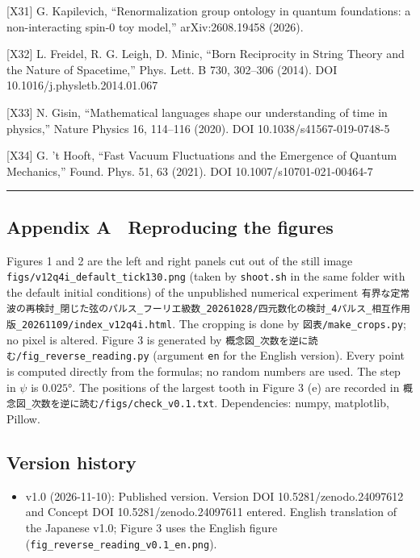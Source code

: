 \documentclass[
  a4paper,
]{article}
\providecommand{\tightlist}{%
  \setlength{\itemsep}{0pt}\setlength{\parskip}{0pt}}
\begin{document}
{[}X31{]} G. Kapilevich, ``Renormalization group ontology in quantum
foundations: a non-interacting spin-0 toy model,'' arXiv:2608.19458
(2026).

{[}X32{]} L. Freidel, R. G. Leigh, D. Minic, ``Born Reciprocity in
String Theory and the Nature of Spacetime,'' Phys. Lett. B 730, 302--306
(2014). DOI 10.1016/j.physletb.2014.01.067

{[}X33{]} N. Gisin, ``Mathematical languages shape our understanding of
time in physics,'' Nature Physics 16, 114--116 (2020). DOI
10.1038/s41567-019-0748-5

{[}X34{]} G. 't Hooft, ``Fast Vacuum Fluctuations and the Emergence of
Quantum Mechanics,'' Found. Phys. 51, 63 (2021). DOI
10.1007/s10701-021-00464-7

\begin{center}\rule{0.5\linewidth}{0.5pt}\end{center}

\subsection{Appendix A　Reproducing the
figures}\label{appendix-a-reproducing-the-figures}

Figures 1 and 2 are the left and right panels cut out of the still image
\texttt{figs/\allowbreak{}v12q4i\_\allowbreak{}default\_\allowbreak{}tick130.png} (taken by \texttt{shoot.sh}
in the same folder with the default initial conditions) of the
unpublished numerical experiment
\texttt{有界な定常波の再検討\_\allowbreak{}閉じた弦のパルス\_\allowbreak{}フーリエ級数\_\allowbreak{}20261028/\allowbreak{}四元数化の検討\_\allowbreak{}4パルス\_\allowbreak{}相互作用版\_\allowbreak{}20261109/\allowbreak{}index\_\allowbreak{}v12q4i.html}.
The cropping is done by \texttt{図表/\allowbreak{}make\_\allowbreak{}crops.py}; no pixel is
altered. Figure 3 is generated by
\texttt{概念図\_\allowbreak{}次数を逆に読む/\allowbreak{}fig\_\allowbreak{}reverse\_\allowbreak{}reading.py} (argument
\texttt{en} for the English version). Every point is computed directly
from the formulas; no random numbers are used. The step in \(\psi\) is
\(0.025°\). The positions of the largest tooth in Figure 3 (e) are
recorded in \texttt{概念図\_\allowbreak{}次数を逆に読む/\allowbreak{}figs/\allowbreak{}check\_\allowbreak{}v0.1.txt}.
Dependencies: numpy, matplotlib, Pillow.

\subsection{Version history}\label{version-history}

\begin{itemize}
\tightlist
\item
  v1.0 (2026-11-10): Published version. Version DOI
  10.5281/zenodo.24097612 and Concept DOI 10.5281/zenodo.24097611
  entered. English translation of the Japanese v1.0; Figure 3 uses the
  English figure (\texttt{fig\_\allowbreak{}reverse\_\allowbreak{}reading\_\allowbreak{}v0.1\_\allowbreak{}en.png}).
\end{itemize}
\end{document}
